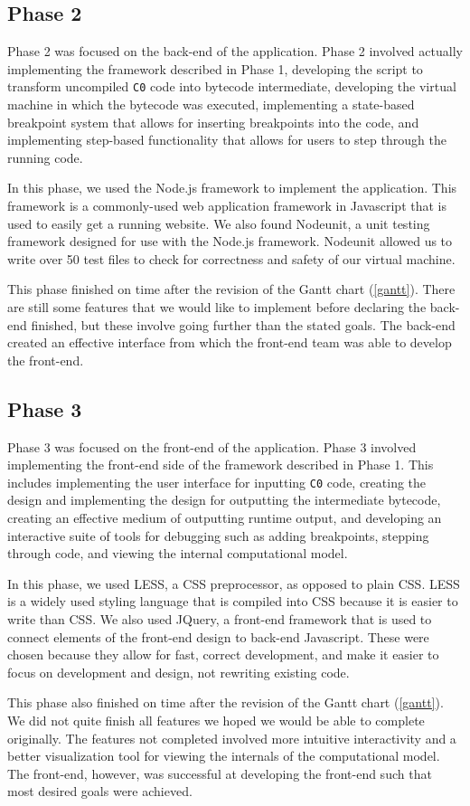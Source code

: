 \documentclass[11pt]{article}
\begin{document}
\subsection{Phase 2}
Phase 2 was focused on the back-end of the application. Phase 2 involved
actually implementing the framework described in Phase 1, developing the script
to transform uncompiled {\tt C0} code into bytecode intermediate, developing
the virtual machine in which the bytecode was executed, implementing a
state-based breakpoint system that allows for inserting breakpoints into the
code, and implementing step-based functionality that allows for users to step
through the running code.
\par
In this phase, we used the Node.js framework to implement the application. This
framework is a commonly-used web application framework in Javascript that is
used to easily get a running website. We also found Nodeunit, a unit testing
framework designed for use with the Node.js framework. Nodeunit allowed us to
write over 50 test files to check for correctness and safety of our virtual
machine.
\par
This phase finished on time after the revision of the Gantt chart (\ref{gantt}).
There are still some features that we would like to implement before declaring
the back-end finished, but these involve going further than the stated goals.
The back-end created an effective interface from which the front-end team was
able to develop the front-end.
\subsection{Phase 3}
Phase 3 was focused on the front-end of the application. Phase 3 involved
implementing the front-end side of the framework described in Phase 1. This
includes implementing the user interface for inputting {\tt C0} code, creating
the design and implementing the design for outputting the intermediate
bytecode, creating an effective medium of outputting runtime output, and
developing an interactive suite of tools for debugging such as adding
breakpoints, stepping through code, and viewing the internal computational
model.
\par
In this phase, we used LESS, a CSS preprocessor, as opposed to plain CSS. LESS
is a widely used styling language that is compiled into CSS because it is easier
to write than CSS. We also used JQuery, a front-end framework that is used to
connect elements of the front-end design to back-end Javascript. These were
chosen because they allow for fast, correct development, and make it easier
to focus on development and design, not rewriting existing code.
\par
This phase also finished on time after the revision of the Gantt chart
(\ref{gantt}). We did not quite finish all features we hoped we would be able
to complete originally. The features not completed involved more intuitive
interactivity and a better visualization tool for viewing the internals of the
computational model. The front-end, however, was successful at developing the
front-end such that most desired goals were achieved.
\end{document}
